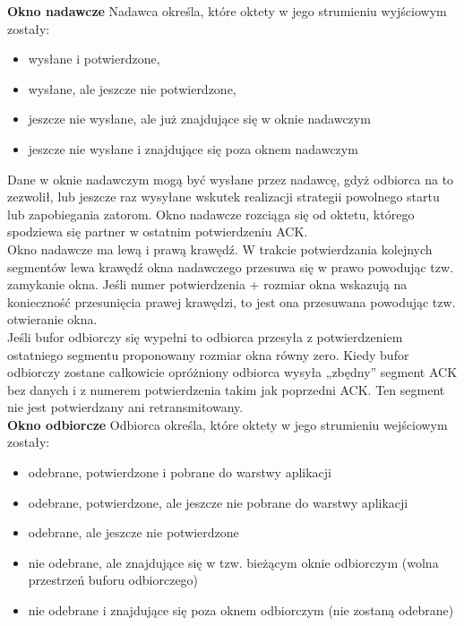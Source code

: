 \documentclass[../main.tex]{subfiles}
\begin{document}
    \textbf{Okno nadawcze}
    Nadawca określa, które oktety w jego strumieniu wyjściowym zostały:
    \begin{itemize}
        \item wysłane i potwierdzone,
        \item wysłane, ale jeszcze nie potwierdzone,
        \item jeszcze nie wysłane, ale już znajdujące się w oknie nadawczym
        \item jeszcze nie wysłane i znajdujące się poza oknem nadawczym
    \end{itemize}
    Dane w oknie nadawczym mogą być wysłane przez nadawcę, gdyż odbiorca na to zezwolił, lub jeszcze raz wysyłane wskutek realizacji strategii powolnego startu lub zapobiegania zatorom.
    Okno nadawcze rozciąga się od oktetu, którego spodziewa się partner w ostatnim
    potwierdzeniu ACK.\\
    Okno nadawcze ma lewą i prawą krawędź. W trakcie potwierdzania kolejnych segmentów
    lewa krawędź okna nadawczego przesuwa się w prawo powodując tzw. zamykanie okna. Jeśli
    numer potwierdzenia + rozmiar okna wskazują na konieczność przesunięcia prawej krawędzi,
    to jest ona przesuwana powodując tzw. otwieranie okna.\\
    Jeśli bufor odbiorczy się wypełni to odbiorca przesyła z
    potwierdzeniem ostatniego segmentu proponowany rozmiar okna równy zero.
    Kiedy bufor odbiorczy zostane całkowicie opróżniony odbiorca wysyła
    „zbędny” segment ACK bez danych i z numerem potwierdzenia takim jak poprzedni ACK. Ten
    segment nie jest potwierdzany ani retransmitowany.\\

    \textbf{Okno odbiorcze}
    Odbiorca określa, które oktety w jego strumieniu wejściowym zostały:
    \begin{itemize}
        \item odebrane, potwierdzone i pobrane do warstwy aplikacji
        \item odebrane, potwierdzone, ale jeszcze nie pobrane do warstwy aplikacji
        \item odebrane, ale jeszcze nie potwierdzone
        \item nie odebrane, ale znajdujące się w tzw. bieżącym oknie odbiorczym (wolna przestrzeń buforu odbiorczego)
        \item nie odebrane i znajdujące się poza oknem odbiorczym (nie zostaną odebrane)
    \end{itemize}
\end{document}
